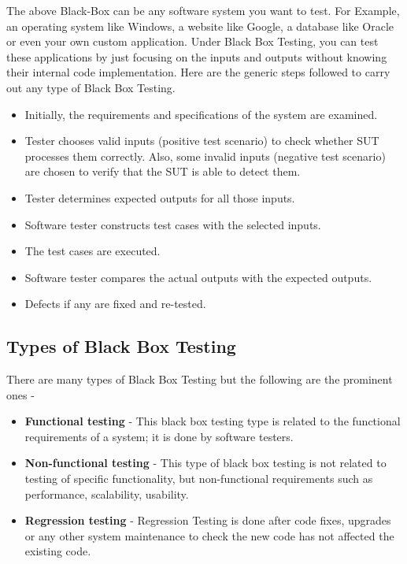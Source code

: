 The above Black-Box can be any software system you want to test. For Example, an operating system like Windows, a website like Google, a database like Oracle or even your own custom application. Under Black Box Testing, you can test these applications by just focusing on the inputs and outputs without knowing their internal code implementation. 
Here are the generic steps followed to carry out any type of Black Box Testing.
\begin{itemize}
	\item Initially, the requirements and specifications of the system are examined.
	\item Tester chooses valid inputs (positive test scenario) to check whether SUT processes them correctly. Also, some invalid inputs (negative test scenario) are chosen to verify that the SUT is able to detect them.
	\item Tester determines expected outputs for all those inputs.
	\item Software tester constructs test cases with the selected inputs.
	\item The test cases are executed.
	\item Software tester compares the actual outputs with the expected outputs.
	\item Defects if any are fixed and re-tested.
	 
\end{itemize}

\subsection{Types of Black Box Testing}
There are many types of Black Box Testing but the following are the prominent ones -
\begin{itemize}
	\item \textbf{Functional testing} - This black box testing type is related to the functional requirements of a system; it is done by software testers.
	\item \textbf{Non-functional testing} - This type of black box testing is not related to testing of specific functionality, but non-functional requirements such as performance, scalability, usability.
	\item \textbf{Regression testing} - Regression Testing is done after code fixes, upgrades or any other system maintenance to check the new code has not affected the existing code.
	
\end{itemize}


